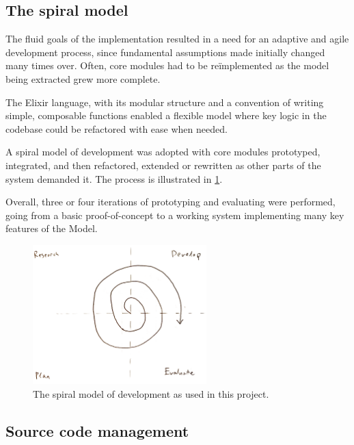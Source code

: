 \subsection{The spiral model}\label{sec:prep:softeng:spiral}

The fluid goals of the implementation resulted in a need for an adaptive and agile development process, since fundamental assumptions made initially changed many times over.
Often, core modules had to be re\"implemented as the model being extracted grew more complete.

The Elixir language, with its modular structure and a convention of writing simple, composable functions enabled a flexible model where key logic in the codebase could be refactored with ease when needed.

A spiral model \cite{Boehm:1986} of development was adopted with core modules prototyped, integrated, and then refactored, extended or rewritten as other parts of the system demanded it.
The process is illustrated in \cref{fig:prep:spiral-model}.

Overall, three or four iterations of prototyping and evaluating were performed, going from a basic proof-of-concept to a working system implementing many key features of the Model.

\begin{figure}[h]
	\centering
	\includegraphics[width=0.6\textwidth]{images/temp/spiral}
	\caption{The spiral model of development as used in this project.}
	\label{fig:prep:spiral-model}
\end{figure}



\subsection{Source code management}\label{sec:prep:softeng:scm}

